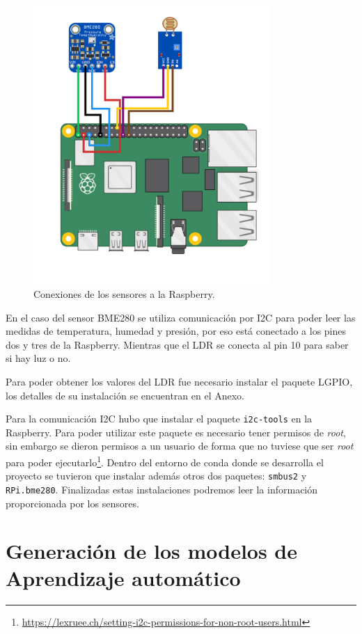 \documentclass[a4paper, 12pt]{book}
\begin{document}
\begin{figure}[]
  \centering
  \includegraphics[width=9cm, keepaspectratio]{img/circuito.png}
  \caption{Conexiones de los sensores a la Raspberry.}\label{fig:circuito}
\end{figure}

En el caso del sensor BME280 se utiliza comunicación por I2C para poder leer las medidas de temperatura, humedad y presión, por eso está conectado a los pines dos y tres de la Raspberry. Mientras que el LDR se conecta al pin 10 para saber si hay luz o no.

Para poder obtener los valores del LDR fue necesario instalar el paquete LGPIO, los detalles de su instalación se encuentran en el Anexo.

Para la comunicación I2C hubo que instalar el paquete \texttt{i2c-tools} en la Raspberry. Para poder utilizar este paquete es necesario tener permisos de \textit{root}, sin embargo se dieron permisos a un usuario de forma que no tuviese que ser \textit{root} para poder ejecutarlo\footnote{\url{https://lexruee.ch/setting-i2c-permissions-for-non-root-users.html}}. Dentro del entorno de conda donde se desarrolla el proyecto se tuvieron que instalar además otros dos paquetes: \texttt{smbus2} y \texttt{RPi.bme280}. Finalizadas estas instalaciones podremos leer la información proporcionada por los sensores.

\section{Generación de los modelos de Aprendizaje automático}
\label{sec:generacion_modelos}
\end{document}
